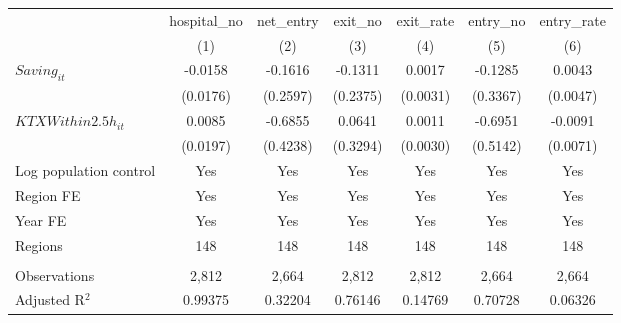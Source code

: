 \begingroup
\centering
\begin{tabular}{lcccccc}
   \toprule
                          & hospital\_no  & net\_entry  & exit\_no  & exit\_rate  & entry\_no  & entry\_rate \\    
                          & (1)           & (2)         & (3)       & (4)         & (5)        & (6)\\  
   \midrule 
   $Saving_{it}$          & -0.0158       & -0.1616     & -0.1311   & 0.0017      & -0.1285    & 0.0043\\   
                          & (0.0176)      & (0.2597)    & (0.2375)  & (0.0031)    & (0.3367)   & (0.0047)\\   
   $KTXWithin2.5h_{it}$   & 0.0085        & -0.6855     & 0.0641    & 0.0011      & -0.6951    & -0.0091\\   
                          & (0.0197)      & (0.4238)    & (0.3294)  & (0.0030)    & (0.5142)   & (0.0071)\\   
   Log population control & Yes           & Yes         & Yes       & Yes         & Yes        & Yes\\  
   Region FE              & Yes           & Yes         & Yes       & Yes         & Yes        & Yes\\  
   Year FE                & Yes           & Yes         & Yes       & Yes         & Yes        & Yes\\  
   Regions                & 148           & 148         & 148       & 148         & 148        & 148\\  
    \\
   Observations           & 2,812         & 2,664       & 2,812     & 2,812       & 2,664      & 2,664\\  
   Adjusted R$^2$         & 0.99375       & 0.32204     & 0.76146   & 0.14769     & 0.70728    & 0.06326\\  
   \bottomrule
\end{tabular}
\par\endgroup
